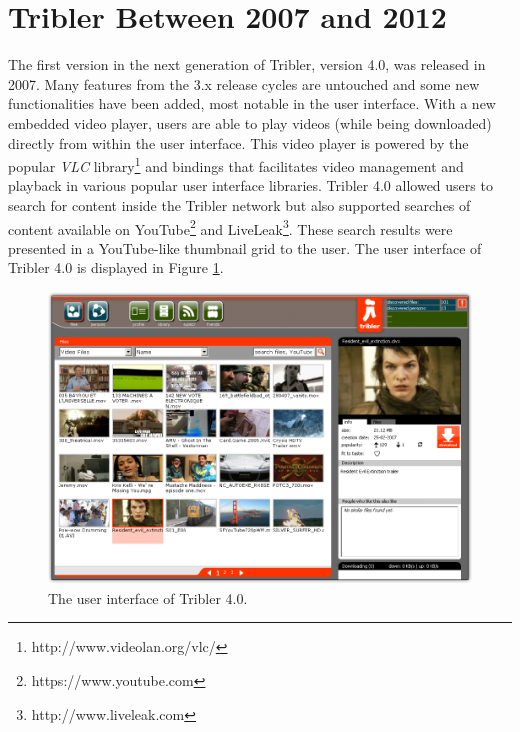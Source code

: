 \section{Tribler Between 2007 and 2012}
The first version in the next generation of Tribler, version 4.0, was released in 2007\cite{tribler4tf}. Many features from the 3.x release cycles are untouched and some new functionalities have been added, most notable in the user interface. With a new embedded video player, users are able to play videos (while being downloaded) directly from within the user interface. This video player is powered by the popular \emph{VLC} library\footnote{http://www.videolan.org/vlc/} and bindings that facilitates video management and playback in various popular user interface libraries. Tribler 4.0 allowed users to search for content inside the Tribler network but also supported searches of content available on YouTube\footnote{https://www.youtube.com} and LiveLeak\footnote{http://www.liveleak.com}. These search results were presented in a YouTube-like thumbnail grid to the user. The user interface of Tribler 4.0 is displayed in Figure \ref{fig:tribler4}.\\

\begin{figure}[h!]
	\centering
	\includegraphics[width=1.0\columnwidth]{images/tribler4}
	\caption{The user interface of Tribler 4.0.}
	\label{fig:tribler4}
\end{figure}

